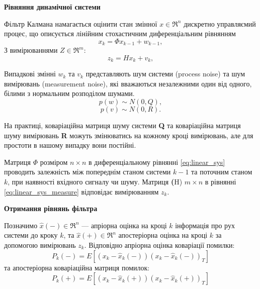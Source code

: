\textbf{Рівняння динамічної системи}

Фільтр Калмана намагається оцінити стан змінної $x\in \Re^{n}$ дискретно управляємий
процес, що описується лінійним стохастичним диференціальним рівнянням
\begin{equation}
\label{eq:linear_sys}
x_{k} = \Phi x_{k-1} + w_{k-1},
\end{equation}
З вимірюваннями  $Z\in \Re^{m}$:
\begin{equation}
\label{eq:linear_sys_measure}
z_{k} = Hx_{k} +v_{k},
\end{equation}

Випадкові змінні $w_{k}$ та $v_{k}$ представляють шум системи (process noise) та 
шум вимірювань (measurement noise), які вважаються незалежними один від одного,
білими з нормальним розподілом шумами.
\begin{equation}\label{eq:pw} p(w)\sim N(0,Q),\end{equation}
\begin{equation}\label{eq:pv} p(v)\sim N(0,R).\end{equation}

На практиці, коваріаційна матриця шуму системи \textbf{Q} та коваріаційна
матриця шуму вимірювань \textbf{R} можуть змінюватись на кожному кроці вимірювань,
але для простоти в нашому випадку вони постійні.

Матриця $\Phi$ розміром $n \times n$ в диференціальному рівнянні \eqref{eq:linear_sys}
проводить залежність між попереднім станом системи $k-1$ та поточним станом
$k$, при наявності вхідного сигналу чи шуму. Матриця \textbf(H) $m \times n$ в 
рівнянні \eqref{eq:linear_sys_measure} відповідає вимірюванням $z_{k}$. 

\textbf{Отримання рівнянь фільтра}

Позначимо $\hat{x}(-) \in \Re^{n}$ --- апріорна оцінка на кроці $k$ 
інформація про рух системи до кроку $k$, та $\hat{x}(+) \in \Re^{n}$
апостеріорна оцінка на кроці $k$ за допомогою вимірювань $z_{k}$. 
Відповідно апріорна оцінка коваріації помилки:
\begin{equation}
\label{eq:p_minux}
P_{k}(-)= E[(x_{k}-\hat{x}_{k}(-))(x_{k}-\hat{x}_{k}(-))_{T}]
\end{equation}
та апостеріорна коваріаційна матриця помилок:
\begin{equation}
\label{eq:p_plus}
P_{k}(+)= E[(x_{k}-\hat{x}_{k}(+))(x_{k}-\hat{x}_{k}(+))_{T}]
\end{equation}

